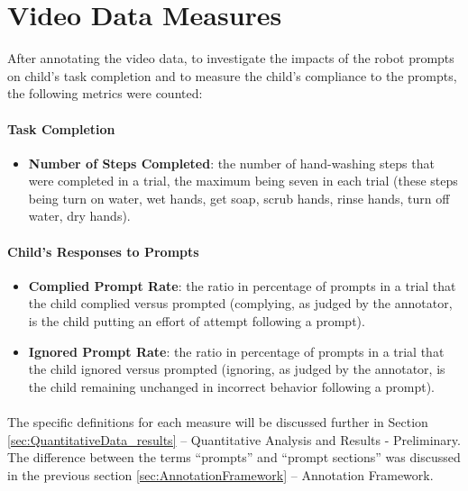 \section{Video Data Measures}
\label{sec:measures}
After annotating the video data, to investigate the impacts of the robot prompts on child's task completion and to measure the child's compliance to the prompts, the following metrics were counted:

\paragraph{Task Completion}
\begin{itemize}
	\item \textbf{Number of Steps Completed}: the number of hand-washing steps that were completed in a trial, the maximum being seven in each trial (these steps being turn on water, wet hands, get soap, scrub hands, rinse hands, turn off water, dry hands).
\end{itemize}

\paragraph{Child's Responses to Prompts}
\begin{itemize}
	\item \textbf{Complied Prompt Rate}: the ratio in percentage of prompts in a trial that the child complied versus prompted (complying, as judged by the annotator, is the child putting an effort of attempt following a prompt).
	\item \textbf{Ignored Prompt Rate}: the ratio in percentage of prompts in a trial that the child ignored versus prompted (ignoring, as judged by the annotator, is the child remaining unchanged in incorrect behavior following a prompt).
\end{itemize}


\paragraph{} %
The specific definitions for each measure will be discussed further in Section \ref{sec:QuantitativeData_results} -- Quantitative Analysis and Results - Preliminary.  The difference between the terms ``prompts'' and ``prompt sections'' was discussed in the previous section \ref{sec:AnnotationFramework} -- Annotation Framework.